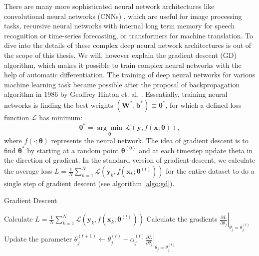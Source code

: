 \documentclass[12pt, a4paper,  nobibnotes]{article}
\begin{document}
There are many more sophisticated neural network architectures like convolutional neural networks (CNNs)
\cite{LeCun-CNN}, which are useful for image processing tasks, recursive neural networks 
with internal long term memory \cite{SchmidhuberLSTM} for speech recognition or time-series 
forecasting, or transformers \cite{Transformer} for machine translation. 
To dive into the details of these complex deep neural network architectures is out of the 
scope of this thesis. 
We will, however explain the gradient descent (GD) algorithm, which makes it possible to train 
complex neural networks with the help of automatic differentiation.
The training of deep neural networks for various machine learning task
became possible after the proposal of backpropagation algorithm in 1986 by 
Geoffrey Hinton et. al. \cite{BackpropPaper}.
Essentially, training neural networks is finding the best weights $(\mathbf W^*, \mathbf b^*)\equiv
\pmb\theta^*$, for which a defined loss function $\mathcal L$ has minimum:
\begin{equation}
    \pmb\theta^* = \underset{\pmb\theta}{\arg\min}\,\mathcal L (\mathbf y, f(\mathbf x; \pmb\theta)),
\end{equation}
where $f(\cdot; \pmb\theta)$ represents the neural network. The idea of gradient descent is 
to find $\pmb\theta^*$ by starting at a random point $\pmb\theta^{(0)}$ and at each timestep
update theta in the direction of gradient. In the standard version of gradient-descent, 
we calculate the average loss $L = \frac{1}{N}\sum\limits_{k=1}^N \mathcal L(\mathbf y_k, f(\mathbf x_k; \pmb\theta^{(t)}))$
for the entire dataset to do a single step of gradient descent (see algorithm \ref{algo:gd}).
\begin{algorithm}[H]
    \caption{Gradient Descent}
    \begin{algorithmic}[1]
            \State Calculate $L = \frac{1}{N}\sum\limits_{k=1}^N \mathcal L(\mathbf y_k, f(\mathbf x_k; \pmb\theta^{(t)}))$ 
                \State Calculate the gradients $ \left. \frac{\partial L}{\partial \theta_j} \right|_{\theta_j = \theta_j^{(t)}}$
                \State Update the parameter $\theta_j^{(t+1)} \leftarrow \theta_j^{(t)} - \alpha_j^{(t)} \left. \frac{\partial L}{\partial \theta_j} \right|_{\theta_j = \theta_j^{(t)}}$
            \EndFor
        \EndFor
    \EndProcedure
    \end{algorithmic}
    \label{algo:gd}
\end{algorithm}
\end{document}
